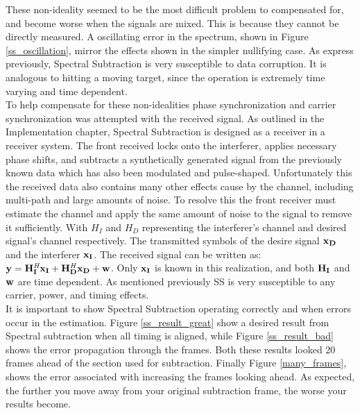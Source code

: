 These non-ideality seemed to be the most difficult problem to compensated for, and become worse when the signals are mixed.  This is because they cannot be directly measured.  A oscillating error in the spectrum, shown in Figure \ref{ss_oscillation}, mirror the effects shown in the simpler nullifying case.  As express previously, Spectral Subtraction is very susceptible to data corruption.  It is analogous to hitting a moving target, since the operation is extremely time varying and time dependent.\\  

To help compensate for these non-idealities phase synchronization and carrier synchronization was attempted with the received signal.  As outlined in the Implementation chapter, Spectral Subtraction is designed as a receiver in a receiver system.  The front received locks onto the interferer, applies necessary phase shifts, and subtracts a synthetically generated signal from the previously known data which has also been modulated and pulse-shaped.  Unfortunately this the received data also contains many other effects cause by the channel, including multi-path and large amounts of noise.  To resolve this the front receiver must estimate the channel and apply the same amount of noise to the signal to remove it sufficiently.  With \(H_{I}\) and \(H_{D}\) representing the interferer's channel and desired signal's channel respectively.  The transmitted symbols of the desire signal \(\bf{x}_{D}\) and the interferer \(\bf{x}_{I}\).  The received signal can be written as: \( \bf{y}=H_{I}^\textit{H}x_{I}+H_{D}^\textit{H}x_{D}+w \).  Only \(\bf{x_{I}}\) is known in this realization, and both \(\bf{H_{I}}\) and \(\bf{w}\) are time dependent.  As mentioned previously SS is very susceptible to any carrier, power, and timing effects.\\


It is important to show Spectral Subtraction operating correctly and when errors occur in the estimation.  Figure \ref{ss_result_great} show a desired result from Spectral subtraction when all timing is aligned, while Figure \ref{ss_result_bad} shows the error propagation through the frames.  Both these results looked 20 frames ahead of the section used for subtraction.  Finally Figure \ref{many_frames}, shows the error associated with increasing the frames looking ahead.  As expected, the further you move away from your original subtraction frame, the worse your results become.\\

